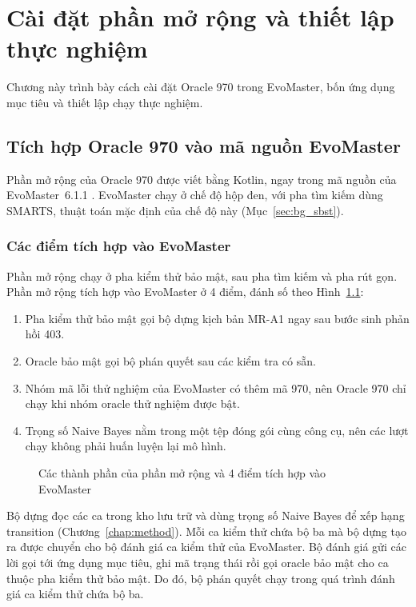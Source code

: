 \chapter{Cài đặt phần mở rộng và thiết lập thực nghiệm}
\label{chap:impl}

Chương này trình bày cách cài đặt Oracle 970 trong EvoMaster, bốn ứng dụng mục tiêu và thiết lập chạy thực nghiệm.

\section{Tích hợp Oracle 970 vào mã nguồn EvoMaster}
\label{sec:impl_evomaster}

Phần mở rộng của Oracle 970 được viết bằng Kotlin, ngay trong mã nguồn của EvoMaster~6.1.1 \cite{evomaster611}. EvoMaster chạy ở chế độ hộp đen, với pha tìm kiếm dùng SMARTS, thuật toán mặc định của chế độ này (Mục~\ref{sec:bg_sbst}).

\subsection{Các điểm tích hợp vào EvoMaster}
\label{subsec:impl_hooks}

Phần mở rộng chạy ở pha kiểm thử bảo mật, sau pha tìm kiếm và pha rút gọn. Phần mở rộng tích hợp vào EvoMaster ở 4 điểm, đánh số theo Hình~\ref{fig:evomaster_integration}:
\begin{enumerate}
  \item Pha kiểm thử bảo mật gọi bộ dựng kịch bản MR-A1 ngay sau bước sinh phản hồi 403.
  \item Oracle bảo mật gọi bộ phán quyết sau các kiểm tra có sẵn.
  \item Nhóm mã lỗi thử nghiệm của EvoMaster có thêm mã 970, nên Oracle 970 chỉ chạy khi nhóm oracle thử nghiệm được bật.
  \item Trọng số Naive Bayes nằm trong một tệp đóng gói cùng công cụ, nên các lượt chạy không phải huấn luyện lại mô hình.
\end{enumerate}

\begin{figure}[htbp]
  \centering
  
  \caption{Các thành phần của phần mở rộng và 4 điểm tích hợp vào EvoMaster}
  \label{fig:evomaster_integration}
\end{figure}

Bộ dựng đọc các ca trong kho lưu trữ và dùng trọng số Naive Bayes để xếp hạng transition (Chương~\ref{chap:method}). Mỗi ca kiểm thử chứa bộ ba mà bộ dựng tạo ra được chuyển cho bộ đánh giá ca kiểm thử của EvoMaster. Bộ đánh giá gửi các lời gọi tới ứng dụng mục tiêu, ghi mã trạng thái rồi gọi oracle bảo mật cho ca thuộc pha kiểm thử bảo mật. Do đó, bộ phán quyết chạy trong quá trình đánh giá ca kiểm thử chứa bộ ba.

